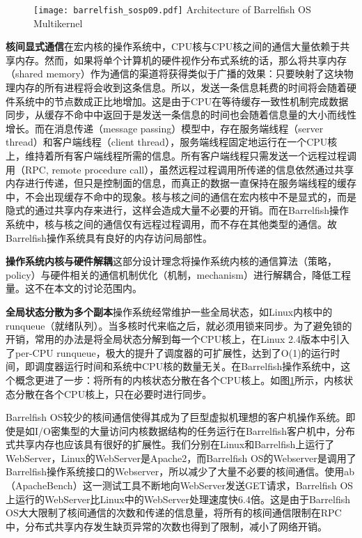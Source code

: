 \begin{figure}[!htp]
  \centering
  \texttt{[image: barrelfish\_sosp09.pdf]}
    {Architecture of Barrelfish OS Multikernel}
  \label{fig:barrelfish}
\end{figure}

\noindent\textbf{核间显式通信}\quad 在宏内核的操作系统中，CPU核与CPU核之间的通信大量依赖于共享内存。然而，如果将单个计算机的硬件视作分布式系统的话，那么将共享内存（shared memory）作为通信的渠道将获得类似于广播的效果：只要映射了这块物理内存的所有进程将会收到这条信息。所以，发送一条信息耗费的时间将会随着硬件系统中的节点数成正比地增加。这是由于CPU在等待缓存一致性机制完成数据同步，从缓存不命中中返回于是发送一条信息的时间也会随着信息量的大小而线性增长。而在消息传递（message passing）模型中，存在服务端线程（server thread）和客户端线程（client thread），服务端线程固定地运行在一个CPU核上，维持着所有客户端线程所需的信息。所有客户端线程只需发送一个远程过程调用（RPC, remote procedure call），虽然远程过程调用所传递的信息依然通过共享内存进行传递，但只是控制面的信息，而真正的数据一直保持在服务端线程的缓存中，不会出现缓存不命中的现象。核与核之间的通信在宏内核中不是显式的，而是隐式的通过共享内存来进行，这样会造成大量不必要的开销。而在Barrelfish操作系统中，核与核之间的通信仅有远程过程调用，而不存在其他类型的通信。故Barrelfish操作系统具有良好的内存访问局部性。

\noindent\textbf{操作系统内核与硬件解耦}\quad 这部分设计理念将操作系统内核的通信算法（策略，policy）与硬件相关的通信机制优化（机制，mechanism）进行解耦合，降低工程量。这不在本文的讨论范围内。

\noindent\textbf{全局状态分散为多个副本}\quad 操作系统经常维护一些全局状态，如Linux内核中的runqueue（就绪队列）。当多核时代来临之后，就必须用锁来同步。为了避免锁的开销，常用的办法是将全局状态分解到每一个CPU核上，在Linux 2.4版本\cite{linux}中引入了per-CPU runqueue，极大的提升了调度器的可扩展性，达到了O(1)的运行时间，即调度器运行时间和系统中CPU核的数量无关。在Barrelfish操作系统中，这个概念更进了一步：将所有的内核状态分散在各个CPU核上。如图\ref{fig:barrelfish}所示，内核状态分散在各个CPU核上，只在必要时进行同步。


Barrelfish OS较少的核间通信使得其成为了巨型虚拟机理想的客户机操作系统。即使是如I/O密集型的大量访问内核数据结构的任务运行在Barrelfish客户机中，分布式共享内存也应该具有很好的扩展性。我们分别在Linux和Barrelfish上运行了WebServer，Linux的WebServer是Apache2，而Barrelfish OS的Webserver是调用了Barrelfish操作系统接口的Webserver，所以减少了大量不必要的核间通信。使用ab（ApacheBench）\cite{ab}这一测试工具不断地向WebServer发送GET请求，Barrelfish OS上运行的WebServer比Linux中的WebServer处理速度快6.4倍\cite{giantvm}。这是由于Barrelfish OS大大限制了核间通信的次数和传递的信息量，将所有的核间通信限制在RPC中，分布式共享内存发生缺页异常的次数也得到了限制，减小了网络开销。
